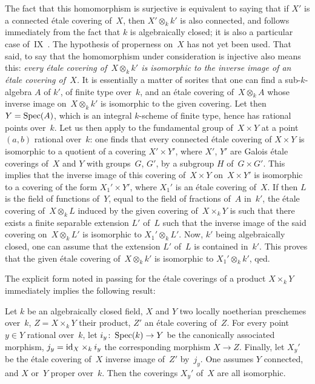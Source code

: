 The fact that this homomorphism is surjective is equivalent to saying
that if $X'$ is a connected \'etale covering of~$X$, then
$X'\otimes_k k'$ is also connected, and follows
immediately from the fact that $k$ is algebraically closed; it is also
a particular case
of~IX~.
The hypothesis of properness on~$X$ has not yet been used. That
said, to say that the homomorphism under consideration is injective also means
this: \emph{every \'etale covering of~$X\otimes_k k'$ is
isomorphic to the inverse image of an \'etale covering of~$X$.}
It is essentially a matter of sorites that one can find a
sub-$k$-algebra $A$ of
$k'$,
of finite type over~$k$, and an
\'etale covering of~$X\otimes_k A$ whose inverse image on~$X\otimes_k k'$ is isomorphic to the given covering. Let then
$Y=\operatorname{Spec}(A)$, which is an integral $k$-scheme of finite type, hence
has rational points over~$k$. Let us then apply  to the
fundamental group of~$X\times Y$ at a point $(a,b)$ rational
over~$k$: one finds that every connected \'etale covering of
$X\times Y$ is isomorphic to a quotient of a covering
$X'\times Y'$, where $X'$, $Y'$ are Galois \'etale
coverings of~$X$ and $Y$ with groups~$G$, $G'$, by a subgroup $H$
of~$G\times G'$. This implies that the inverse image of this
covering of~$X\times Y$ on~$X\times Y'$ is isomorphic to a
covering of the form $X_1'\times Y'$, where $X_1'$ is an
\'etale covering of~$X$. If then $L$ is the field of
functions of~$Y$, equal to the field of fractions of~$A$ in~$k'$, the
\'etale covering of~$X\otimes_k L$ induced by the
given covering of~$X\times_k Y$ is such that there exists a
finite separable extension $L'$ of~$L$ such that the inverse image
of the said covering on~$X\otimes_k L'$ is isomorphic to
$X_1'\otimes_k L'$. Now, $k'$ being algebraically closed, one can
assume that the extension $L'$ of~$L$ is contained in~$k'$. This
proves that the given \'etale covering of~$X\otimes_k k'$
is isomorphic to $X_1'\otimes_k k'$, qed.

The explicit form noted in passing for the \'etale
coverings of a product
$X\times_k Y$ immediately implies the following result:

\begin{corollary}
\label{X.1.9}
Let $k$ be an algebraically closed field, $X$ and $Y$ two
locally noetherian preschemes over~$k$, $Z=X\times_k
Y$ their product, $Z'$ an \'etale covering of~$Z$. For every
point $y\in Y$ rational over~$k$, let $i_y \colon \Spec(k)\to Y$ be the
canonically associated morphism, $j_y = \mathrm{id}_X\times_k i_y$ the
corresponding morphism $X\to Z$. Finally, let $X_y'$ be the \'etale
covering of~$X$ inverse image of~$Z'$ by~$j_y$. One assumes $Y$
connected, and $X$ or~$Y$ proper over~$k$. Then the coverings
$X_y'$ of~$X$ are all isomorphic.
\end{corollary}

